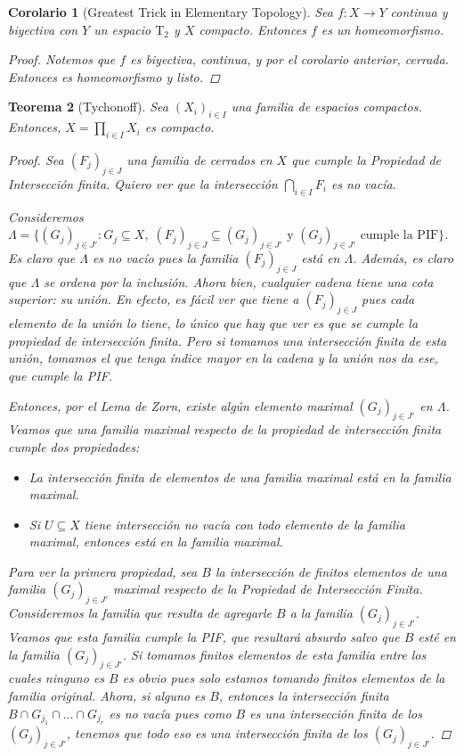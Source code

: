 \documentclass[12pt]{book}
\newtheorem{teo}{Teorema}[section]
\newtheorem{cor}[teo]{Corolario}
\theoremstyle{definition}
\begin{document}
\begin{cor}[Greatest Trick in Elementary Topology]
Sea $f:X\to Y$ continua y biyectiva con $Y$ un espacio $\mathrm{T}_2$ y $X$ compacto. Entonces $f$ es un homeomorfismo.
\begin{proof}
Notemos que $f$ es biyectiva, continua, y por el corolario anterior, cerrada. Entonces es homeomorfismo y listo.
\end{proof}
\end{cor}

\begin{teo}[Tychonoff]
Sea $(X_i)_{i\in I}$ una familia de espacios compactos. Entonces, $X=\displaystyle\prod_{i\in I}X_i$ es compacto.
\begin{proof}
Sea $(F_j)_{j\in J}$ una familia de cerrados en $X$ que cumple la Propiedad de Intersección finita. Quiero ver que la intersección $\displaystyle\bigcap_{i\in I}F_i$ es no vacía.

Consideremos $\Lambda = \{(G_j)_{j\in J'} : G_j\subseteq X, \; (F_j)_{j\in J}\subseteq (G_j)_{j\in J'}\text{ y } (G_j)_{j\in J'}\text{ cumple la PIF}\}$. Es claro que $\Lambda$ es no vacío pues la familia $(F_j)_{j\in J}$ está en $\Lambda$. Además, es claro que $\Lambda$ se ordena por la inclusión. Ahora bien, cualquier cadena tiene una cota superior: su unión. En efecto, es fácil ver que tiene a $(F_j)_{j\in J}$ pues cada elemento de la unión lo tiene, lo único que hay que ver es que se cumple la propiedad de intersección finita. Pero si tomamos una intersección finita de esta unión, tomamos el que tenga índice mayor en la cadena y la unión nos da ese, que cumple la PIF.

Entonces, por el Lema de Zorn, existe algún elemento maximal $(G_j)_{j\in J'}$ en $\Lambda$. Veamos que una familia maximal respecto de la propiedad de intersección finita cumple dos propiedades:

\begin{itemize}
\item La intersección finita de elementos de una familia maximal está en la familia maximal.
\item Si $U\subseteq X$ tiene intersección no vacía con todo elemento de la familia maximal, entonces está en la familia maximal.
\end{itemize}

Para ver la primera propiedad, sea $B$ la intersección de finitos elementos de una familia $(G_j)_{j\in J'}$ maximal respecto de la Propiedad de Intersección Finita. Consideremos la familia que resulta de agregarle $B$ a la familia $(G_j)_{j\in J'}$. Veamos que esta familia cumple la PIF, que resultará absurdo salvo que $B$ esté en la familia $(G_j)_{j\in J'}$. Si tomamos finitos elementos de esta familia entre los cuales ninguno es $B$ es obvio pues solo estamos tomando finitos elementos de la familia original. Ahora, si alguno es $B$, entonces la intersección finita $B\cap G_{j_1} \cap\ldots \cap G_{j_r}$ es no vacía pues como $B$ es una intersección finita de los $(G_j)_{j\in J'}$, tenemos que todo eso es una intersección finita de los $(G_j)_{j\in J'}$.


\end{proof}
\end{teo}
\end{document}
